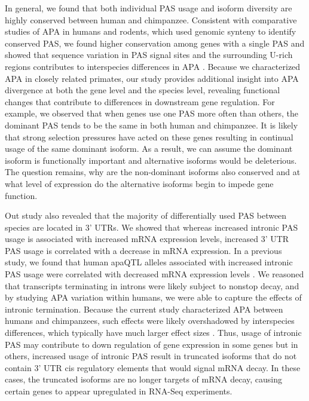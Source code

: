 In general, we found that both individual PAS usage and isoform diversity are highly conserved between human and chimpanzee. Consistent with comparative studies of APA in humans and rodents, which used genomic synteny to identify conserved PAS, we found higher conservation among genes with a single PAS \citep{ara_conservation_2006, wang_compendium_2018} and showed that sequence variation in PAS signal sites and the surrounding U-rich regions contributes to interspecies differences in APA \citep{wang_compendium_2018}. Because we characterized APA in closely related primates, our study provides additional insight into APA divergence at both the gene level and the species level, revealing functional changes that contribute to differences in downstream gene regulation. For example, we observed that when genes use one PAS more often than others, the dominant PAS tends to be the same in both human and chimpanzee. It is likely that strong selection pressures have acted on these genes resulting in continual usage of the same dominant isoform. As a result, we can assume the dominant isoform is functionally important and alternative isoforms would be deleterious. The question remains, why are the non-dominant isoforms also conserved and at what level of expression do the alternative isoforms begin to impede gene function. 

Out study also revealed that the majority of differentially used PAS between species are located in 3' UTRs. We showed that whereas increased intronic PAS usage is associated with increased mRNA expression levels, increased 3' UTR PAS usage is correlated with a decrease in mRNA expression. In a previous study, we found that human apaQTL alleles associated with increased intronic PAS usage were correlated with decreased mRNA expression levels \citep{mittleman_alternative_2020}. We reasoned that transcripts terminating in introns were likely subject to nonstop decay, and by studying APA variation within humans, we were able to capture the effects of intronic termination. Because the current study characterized APA between humans and chimpanzees, such effects were likely overshadowed by interspecies differences, which typically have much larger effect sizes \citep{housman_prime_2020}. Thus, usage of intronic PAS may contribute to down regulation of gene expression in some genes but in others, increased usage of intronic PAS result in truncated isoforms that do not contain 3' UTR cis regulatory elements that would signal mRNA decay. In these cases, the truncated isoforms are no longer targets of mRNA decay, causing certain genes to appear upregulated in RNA-Seq experiments.

